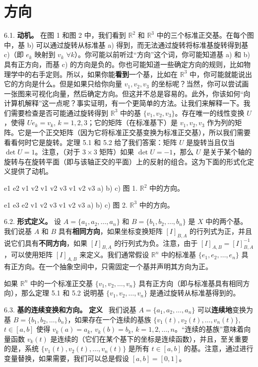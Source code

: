 \section{方向}

6.1. \textbf{动机。} 在图 1 和图 2 中，我们看到 $\mathbb{R}^2$ 和 $\mathbb{R}^3$ 中的三个标准正交基。在每个图中，基 b) 可以通过旋转从标准基 a) 得到，而无法通过旋转将标准基旋转得到基 c)（即 $e_k$ 映射到 $v_k$ $\forall k$）。你可能以前听过“方向”这个词，你可能知道基 a) 和 b) 具有正方向，而基 c) 的方向是负的。你也可能知道一些确定方向的规则，比如物理学中的右手定则。所以，如果你能\textbf{看到}一个基，比如在 $\mathbb{R}^3$ 中，你可能就能说出它的方向是什么。但是如果只给你向量 $v_1, v_2, v_3$ 的坐标呢？当然，你可以尝试画一张图来可视化向量，然后确定方向。但这并不总是容易的。此外，你该如何“向计算机解释”这一点呢？事实证明，有一个更简单的方法。让我们来解释一下。我们需要检查是否可能通过旋转得到 $\mathbb{R}^3$ 中的基 $\{v_1, v_2, v_3\}$。存在唯一的线性变换 $U$，使得 $Ue_k = v_k$, $k=1, 2, 3$；它的矩阵（在标准基下）是 $v_1, v_2, v_3$ 作为列的矩阵。它是一个正交矩阵（因为它将标准正交基变换为标准正交基），所以我们需要看看何时它是旋转。定理 5.1 和 5.2 给了我们答案：矩阵 $U$ 是旋转当且仅当 $\det U = 1$。注意，（对于 $3 \times 3$ 矩阵）如果 $\det U = -1$，那么 $U$ 是关于某个轴的旋转与在旋转平面（即与该轴正交的平面）上的反射的组合。这为下面的形式化定义提供了动机。

e1 e2 v1 v2 v1 v2 v3 v1 v2 v3 a) b) c)
图 1. $\mathbb{R}^2$ 中的方向。

e1 e3 e2 v1 v2 v3 v1 v2 v3 a) b) c)
图 2. $\mathbb{R}^3$ 中的方向。

6.2. \textbf{形式定义。} 设 $A = \{a_1, a_2, \dots, a_n\}$ 和 $B = \{b_1, b_2, \dots, b_n\}$ 是 $X$ 中的两个基。我们说基 $A$ 和 $B$ 具有\textbf{相同方向}，如果坐标变换矩阵 $[I]_{B,A}$ 的行列式为正，并且说它们具有\textbf{不同方向}，如果 $[I]_{B,A}$ 的行列式为负。注意，由于 $[I]_{A,B} = [I]_{B,A}^{-1}$，可以使用矩阵 $[I]_{A,B}$ 来定义。我们通常假设 $\mathbb{R}^n$ 中的标准基 $\{e_1, e_2, \dots, e_n\}$ 具有正方向。在一个抽象空间中，只需固定一个基并声明其方向为正。

如果 $\mathbb{R}^n$ 中的一个标准正交基 $\{v_1, v_2, \dots, v_n\}$ 具有正方向（即与标准基具有相同方向），那么定理 5.1 和 5.2 说明基 $\{v_1, v_2, \dots, v_n\}$ 是通过旋转从标准基得到的。

6.3. \textbf{基的连续变换和方向。}
\textbf{定义}~ 我们说基 $A = \{a_1, a_2, \dots, a_n\}$ 可以\textbf{连续地}变换为基 $B = \{b_1, b_2, \dots, b_n\}$，如果存在一个连续的基族 $\{v_1(t), v_2(t), \dots, v_n(t)\}$, $t \in [a, b]$ 使得 $v_k(a) = a_k$, $v_k(b) = b_k$, $k=1, 2, \dots, n$。“连续的基族”意味着向量函数 $v_k(t)$ 是连续的（它们在某个基下的坐标是连续函数），并且，至关重要的是，系统 $\{v_1(t), v_2(t), \dots, v_n(t)\}$ 是所有 $t \in [a, b]$ 的基。注意，通过进行变量替换，如果需要，我们可以总是假设 $[a, b] = [0, 1]$。

